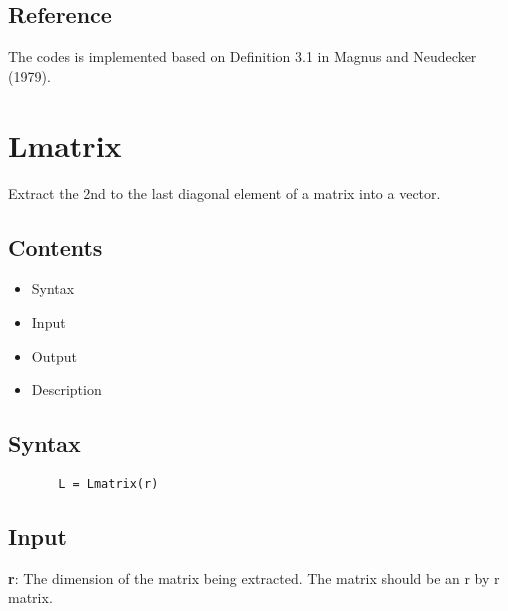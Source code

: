 \documentclass[a4paper,11pt,openany]{memoir}
\begin{document}
\subsection*{Reference}

\begin{par}
The codes is implemented based on Definition 3.1 in Magnus and Neudecker (1979).
\end{par} \vspace{1em}

\newpage

\rmfamily
\color{black}\section{Lmatrix}

\begin{par}
Extract the 2nd to the last diagonal element of a matrix into a vector.
\end{par} \vspace{1em}

\subsection*{Contents}

\begin{itemize}
\setlength{\itemsep}{-1ex}
   \item Syntax
   \item Input
   \item Output
   \item Description
\end{itemize}


\subsection*{Syntax}


\begin{verbatim}       L = Lmatrix(r)\end{verbatim}
    

\subsection*{Input}

\begin{par}
\textbf{r}: The dimension of the matrix being extracted.  The matrix should be an r by r matrix.
\end{par} \vspace{1em}
\end{document}
